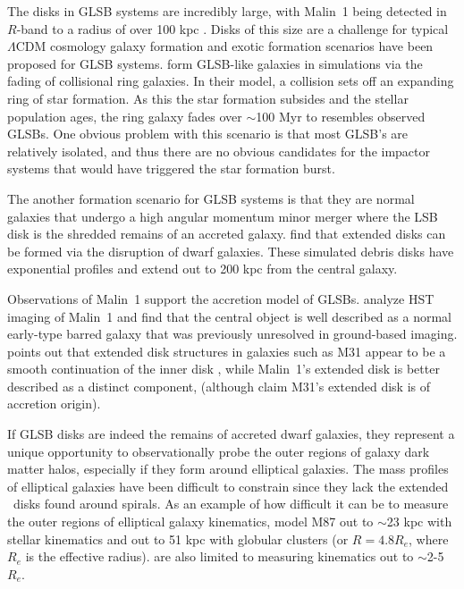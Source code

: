 \documentclass{emulateapj}
\newcommand\HI{\ion{H}{1}}
\begin{document}
The disks in GLSB systems are incredibly large, with Malin~1 being detected in $R$-band to a radius of over 100 kpc \citep{Moore06}.  Disks of this size are a challenge for typical $\Lambda$CDM cosmology galaxy formation and exotic formation scenarios have been proposed for GLSB systems.  \citet{Mapelli08} form GLSB-like galaxies in simulations via the fading of collisional ring galaxies.  In their model, a collision sets off an expanding ring of star formation.  As this the star formation subsides and the stellar population ages, the ring galaxy fades over $\sim$100 Myr to resembles observed GLSBs.  One obvious problem with this scenario is that most GLSB's are relatively isolated, and thus there are no obvious candidates for the impactor systems that would have triggered the star formation burst.  

The another formation scenario for GLSB systems is that they are normal galaxies that undergo a high angular momentum minor merger where the LSB disk is the shredded remains of an accreted galaxy.  \citet{Pen06} find that extended disks can be formed via the disruption of dwarf galaxies.  These simulated debris disks have exponential profiles and extend out to 200 kpc from the central galaxy.

Observations of Malin~1 support the accretion model of GLSBs.  \citet{Barth07} analyze HST imaging of Malin~1 and find that the central object is well described as a normal early-type barred galaxy that was previously unresolved in ground-based imaging. \citet{Barth07} points out that extended disk structures in galaxies such as M31 appear to be a smooth continuation of the inner disk \citep{Ferguson02}, while Malin~1's extended disk is better described as a distinct component, (although \citet{Ibata05} claim M31's extended disk is of accretion origin).


If GLSB disks are indeed the remains of accreted dwarf galaxies, they represent a unique opportunity to observationally probe the outer regions of galaxy dark matter halos, especially if they form around elliptical galaxies.  The mass profiles of elliptical galaxies have been difficult to constrain since they lack the extended \HI\ disks found around spirals.  As an example of how difficult it can be to measure the outer regions of elliptical galaxy kinematics, \citet{Murphy2011} model M87 out to $\sim$23 kpc with stellar kinematics and out to 51 kpc with globular clusters (or $R=4.8 R_e$, where $R_e$ is the effective radius). \citet{Raskutti14} are also limited to measuring kinematics out to $\sim$2-5 $R_e$.  
\end{document}
